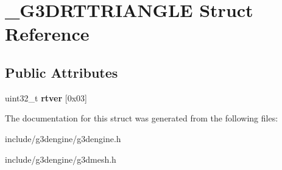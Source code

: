 \hypertarget{struct__G3DRTTRIANGLE}{}\section{\+\_\+\+G3\+D\+R\+T\+T\+R\+I\+A\+N\+G\+LE Struct Reference}
\label{struct__G3DRTTRIANGLE}
\subsection*{Public Attributes}
\begin{DoxyCompactItemize}
\item 
\mbox{\label{struct__G3DRTTRIANGLE_a33f41b92d3d37d332e8e6f3d660dd2e8}} 
uint32\+\_\+t {\bfseries rtver} \mbox{[}0x03\mbox{]}
\end{DoxyCompactItemize}


The documentation for this struct was generated from the following files\+:\begin{DoxyCompactItemize}
\item 
include/g3dengine/g3dengine.\+h\item 
include/g3dengine/g3dmesh.\+h\end{DoxyCompactItemize}
